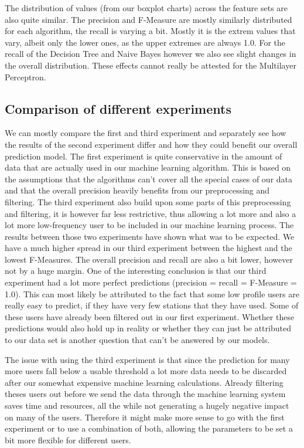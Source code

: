 The distribution of values (from our boxplot charts) across the feature sets are also quite similar. The precision and F-Measure are mostly similarly distributed for each algorithm, the recall is varying a bit. Mostly it is the extrem values that vary, albeit only the lower ones, as the upper extremes are always 1.0. For the recall of the Decision Tree and Naive Bayes however we also see slight changes in the overall distribution. These effects cannot really be attested for the Multilayer Perceptron.

\subsection{Comparison of different experiments}
We can mostly compare the first and third experiment and separately see how the results of the second experiment differ and how they could benefit our overall prediction model.
The first experiment is quite conservative in the amount of data that are actually used in our machine learning algorithm. This is based on the assumptions that the algorithms can't cover all the special cases of our data and that the overall precision heavily benefits from our preprocessing and filtering. The third experiment also build upon some parts of this preprocessing and filtering, it is however far less restrictive, thus allowing a lot more and also a lot more low-frequency user to be included in our machine learning process. The results between those two experiments have shown what was to be expected. We have a much higher spread in our third experiment between the highest and the lowest F-Measures. The overall precision and recall are also a bit lower, however not by a huge margin. One of the interesting conclusion is that our third experiment had a lot more perfect predictions (precision = recall = F-Measure = 1.0). This can most likely be attributed to the fact that some low profile users are really easy to predict, if they have very few stations that they have used. Some of these users have already been filtered out in our first experiment. Whether these predictions would also hold up in reality or whether they can just be attributed to our data set is another question that can't be answered by our models. 

The issue with using the third experiment is that since the prediction for many more users fall below a usable threshold a lot more data needs to be discarded after our somewhat expensive machine learning calculations. Already filtering theses users out before we send the data through the machine learning system saves time and resources, all the while not generating a hugely negative impact on many of the users. Therefore it might make more sense to go with the first experiment or to use a combination of both, allowing the parameters to be set a bit more flexible for different users.

